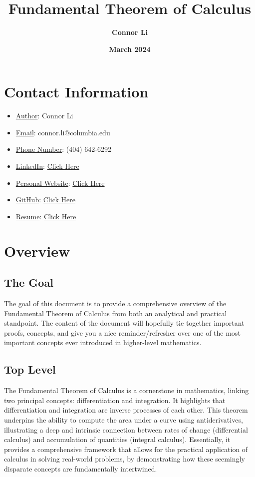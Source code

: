 \documentclass[8pt]{extarticle}
\title{\textbf{Fundamental Theorem of Calculus}}
\author{\textbf{Connor Li}}
\date{\textbf{March 2024}}
\begin{document}
\maketitle


\section*{Contact Information}
\begin{itemize}
    \item \underline{Author}: Connor Li
    \item \underline{Email}: connor.li@columbia.edu
    \item \underline{Phone Number}: (404) 642-6292
    \item \underline{LinkedIn}: \href{https://www.linkedin.com/in/connor-li-4871a71a9/}{Click Here}
    \item \underline{Personal Website}: \href{https://connorli18.github.io/}{Click Here}
    \item \underline{GitHub}: \href{https://github.com/connorli18}{Click Here}
    \item \underline{Resume}: \href{https://drive.google.com/file/d/1G4QryPZy70d9OCKWtcJPA6su5gIfjmIe/view?usp=sharing}{Click Here}
\end{itemize}
\vspace{2cm}
\tableofcontents

\pagebreak
\section{Overview}
\subsection{The Goal}
The goal of this document is to provide a comprehensive overview of the Fundamental Theorem of Calculus from both an analytical and practical standpoint. The content of the document will hopefully tie together important proofs, concepts, and give you a nice reminder/refresher over one of the most important concepts ever introduced in higher-level mathematics.
\subsection{Top Level}
The Fundamental Theorem of Calculus is a cornerstone in mathematics, linking two principal concepts: differentiation and integration. It highlights that differentiation and integration are inverse processes of each other. This theorem underpins the ability to compute the area under a curve using antiderivatives, illustrating a deep and intrinsic connection between rates of change (differential calculus) and accumulation of quantities (integral calculus). Essentially, it provides a comprehensive framework that allows for the practical application of calculus in solving real-world problems, by demonstrating how these seemingly disparate concepts are fundamentally intertwined.
\end{document}
